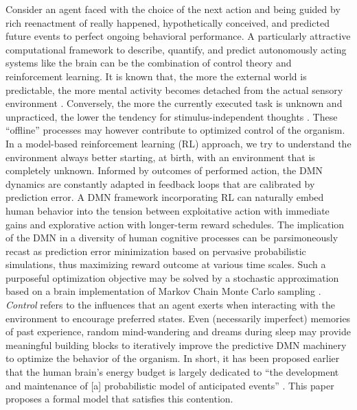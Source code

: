 \documentclass[10pt,letterpaper]{article}
\begin{document}
Consider an agent faced with the choice of the next action
and being guided by rich
reenactment of really happened, hypothetically conceived, and
predicted future events to perfect ongoing behavioral performance.
A particularly attractive computational framework
to describe, quantify, and predict autonomously acting systems like the brain
can be the combination of control theory and reinforcement learning.
It is known that, the more the external world is predictable,
the more mental activity becomes detached from the actual sensory environment
\citep{antrobus1966studies, pope1978regulation}.
Conversely,
the more the currently executed task is unknown and unpracticed,
the lower the tendency for stimulus-independent thoughts
\citep{filler1973daydreaming, teasdale1995stimulus}.
These ``offline'' processes may however contribute to optimized control of the organism.
In a model-based reinforcement learning (RL) approach,
we try to understand the environment always better
starting, at birth, with an environment that is completely unknown.
Informed by outcomes of performed action,
the DMN dynamics are constantly adapted in feedback loops
that are calibrated by prediction error.
A DMN framework incorporating RL can naturally embed human behavior
into the tension between exploitative action with immediate gains and
explorative action with longer-term reward schedules.
The implication of the DMN in a diversity of human cognitive processes
can be parsimoneously recast as prediction error minimization
based on pervasive probabilistic simulations,
thus maximizing reward outcome at various time scales.
Such a purposeful optimization objective
may be solved by a stochastic approximation
based on a brain implementation of Markov Chain Monte Carlo sampling
\citep{tenenbaum2011grow}.
\textit{Control} refers to the influences that an agent exerts when interacting
with the environment to encourage preferred states.
Even (necessarily imperfect) memories
of past experience, random mind-wandering and dreams during sleep
may provide meaningful building blocks to iteratively improve
the predictive DMN machinery to optimize the behavior of the organism.
%
In short, it has been proposed earlier that
the human brain's energy budget is largely dedicated to
``the development and maintenance of [a]
probabilistic model of anticipated events''
\citep{raichle2005intrinsic}.
This paper proposes a formal model that
satisfies this contention.
\end{document}
